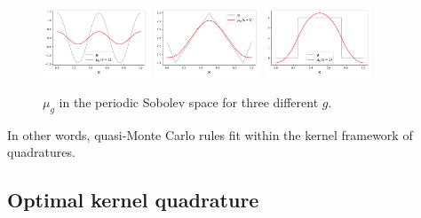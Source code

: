 \documentclass[twoside,11pt]{book}
\numberwithin{theorem}{chapter}
\numberwithin{definition}{chapter}
\numberwithin{proposition}{chapter}
\numberwithin{corollary}{chapter}
\numberwithin{example}{chapter}
\numberwithin{lemma}{chapter}
\numberwithin{assumption}{chapter}
\begin{document}
\begin{figure}[]
    \centering
\includegraphics[width= 0.28\textwidth]{img/mean_element/Sobolev/mean_element_cos_ko_1.pdf}~\includegraphics[width= 0.28\textwidth]{img/mean_element/Sobolev/mean_element_saw_ko_1.pdf}~\includegraphics[width= 0.28\textwidth]{img/mean_element/Sobolev/mean_element_step_ko_1.pdf}\\
\caption{$\mu_{g}$ in the periodic Sobolev space for three different $g$.
\label{fig:mean_element}}
\end{figure}


In other words, quasi-Monte Carlo rules fit within the kernel framework of quadratures. 










\subsection{Optimal kernel quadrature}
\label{subsec:okq_analysis_paradigm}
\end{document}
